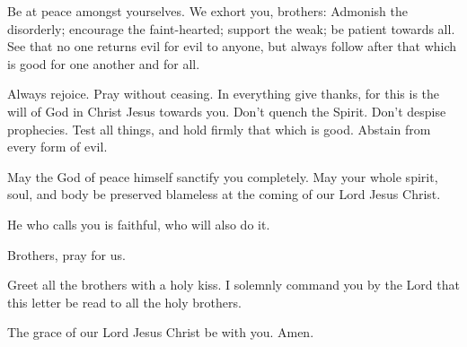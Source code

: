 Be at peace amongst yourselves.  We exhort you, brothers:
Admonish the disorderly; encourage the faint-hearted; support the weak;
be patient towards all.  See that no one returns evil for
evil to anyone, but always follow after that which is good for one
another and for all.

 Always rejoice.  Pray without ceasing.
 In everything give thanks, for this is the will of God in
Christ Jesus towards you.  Don't quench the Spirit.
 Don't despise prophecies.  Test all things,
and hold firmly that which is good.  Abstain from every
form of evil.

 May the God of peace himself sanctify you completely. May
your whole spirit, soul, and body be preserved blameless at the coming
of our Lord Jesus Christ.

 He who calls you is faithful, who will also do it.

 Brothers, pray for us.

 Greet all the brothers with a holy kiss.  I
solemnly command you by the Lord that this letter be read to all the
holy brothers.

 The grace of our Lord Jesus Christ be with you. Amen.
